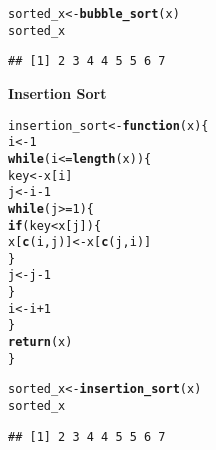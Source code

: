 \documentclass[11pt, a4paper]{article}\usepackage[]{graphicx}\usepackage[]{xcolor}
\makeatletter
\newcommand{\hlnum}[1]{\textcolor[rgb]{0.686,0.059,0.569}{#1}}%
\newcommand{\hlopt}[1]{\textcolor[rgb]{0,0,0}{#1}}%
\newcommand{\hldef}[1]{\textcolor[rgb]{0.345,0.345,0.345}{#1}}%
\newcommand{\hlkwa}[1]{\textcolor[rgb]{0.161,0.373,0.58}{\textbf{#1}}}%
\newcommand{\hlkwb}[1]{\textcolor[rgb]{0.69,0.353,0.396}{#1}}%
\newcommand{\hlkwc}[1]{\textcolor[rgb]{0.333,0.667,0.333}{#1}}%
\newcommand{\hlkwd}[1]{\textcolor[rgb]{0.737,0.353,0.396}{\textbf{#1}}}%
\newenvironment{kframe}{%
 \def\at@end@of@kframe{}%
 \ifinner\ifhmode%
  \def\at@end@of@kframe{\end{minipage}}%
  \begin{minipage}{\columnwidth}%
 \fi\fi%
 \def\FrameCommand##1{\hskip\@totalleftmargin \hskip-\fboxsep
 \colorbox{shadecolor}{##1}\hskip-\fboxsep
     \hskip-\linewidth \hskip-\@totalleftmargin \hskip\columnwidth}%
 \MakeFramed {\advance\hsize-\width
   \@totalleftmargin\z@ \linewidth\hsize
   \@setminipage}}%
 {\par\unskip\endMakeFramed%
 \at@end@of@kframe}
\newenvironment{knitrout}{}{} %
\makeatother
\begin{document}
\begin{knitrout}
\color{fgcolor}\begin{kframe}
\begin{alltt}
\hldef{sorted_x} \hlkwb{<-} \hlkwd{bubble_sort}\hldef{(x)}
\hldef{sorted_x}
\end{alltt}
\begin{verbatim}
## [1] 2 3 4 4 5 5 6 7
\end{verbatim}
\end{kframe}
\end{knitrout}

\newpage

\faArrowAltCircleRight[regular] \hspace{0.5cm} \textbf{Insertion Sort}

\begin{knitrout}
\color{fgcolor}\begin{kframe}
\begin{alltt}
\hldef{insertion_sort} \hlkwb{<-} \hlkwa{function}\hldef{(}\hlkwc{x}\hldef{)\{}
  \hldef{i} \hlkwb{<-} \hlnum{1}
  \hlkwa{while}\hldef{(i} \hlopt{<=} \hlkwd{length}\hldef{(x))\{}
    \hldef{key} \hlkwb{<-} \hldef{x[i]}
    \hldef{j} \hlkwb{<-} \hldef{i} \hlopt{-} \hlnum{1}
    \hlkwa{while}\hldef{(j} \hlopt{>=} \hlnum{1}\hldef{)\{}
      \hlkwa{if}\hldef{(key} \hlopt{<} \hldef{x[j])\{}
        \hldef{x[}\hlkwd{c}\hldef{(i, j)]} \hlkwb{<-} \hldef{x[}\hlkwd{c}\hldef{(j, i)]}
      \hldef{\}}
      \hldef{j} \hlkwb{<-} \hldef{j} \hlopt{-} \hlnum{1}
    \hldef{\}}
    \hldef{i} \hlkwb{<-} \hldef{i} \hlopt{+} \hlnum{1}
  \hldef{\}}
  \hlkwd{return}\hldef{(x)}
\hldef{\}}
\end{alltt}
\end{kframe}
\end{knitrout}

\begin{knitrout}
\color{fgcolor}\begin{kframe}
\begin{alltt}
\hldef{sorted_x} \hlkwb{<-} \hlkwd{insertion_sort}\hldef{(x)}
\hldef{sorted_x}
\end{alltt}
\begin{verbatim}
## [1] 2 3 4 4 5 5 6 7
\end{verbatim}
\end{kframe}
\end{knitrout}

\vspace{0.5cm}
\end{document}
